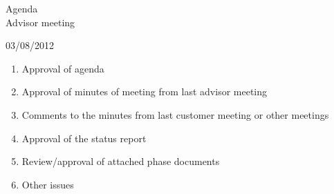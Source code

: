 \documentclass[]{article}
\begin{document}
\thispagestyle{empty}


{\huge Agenda}\\

Advisor meeting

03/08/2012 \\



\large
\begin{enumerate} 
	\item Approval of agenda
	\item Approval of minutes of meeting from last advisor meeting
	\item Comments to the minutes from last customer meeting or other meetings
	\item Approval of the status report
	\item Review/approval of attached phase documents
	\item Other issues
\end{enumerate}
\end{document}
